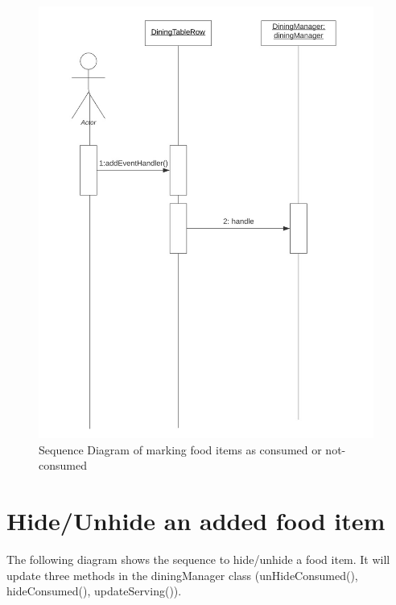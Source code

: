 \documentclass{scrreprt}
\begin{document}
\begin{figure}[!htbp]
\centering
\includegraphics[width=11cm]{pictures/mark-consumed-sd.png}
\caption*{Sequence Diagram of marking food items as consumed or not-consumed}
\end{figure}

\FloatBarrier

\section{Hide/Unhide an added food item}

The following diagram shows the sequence to hide/unhide a food item. It will  update three methods in the diningManager class (unHideConsumed(), hideConsumed(), updateServing()).
\end{document}
